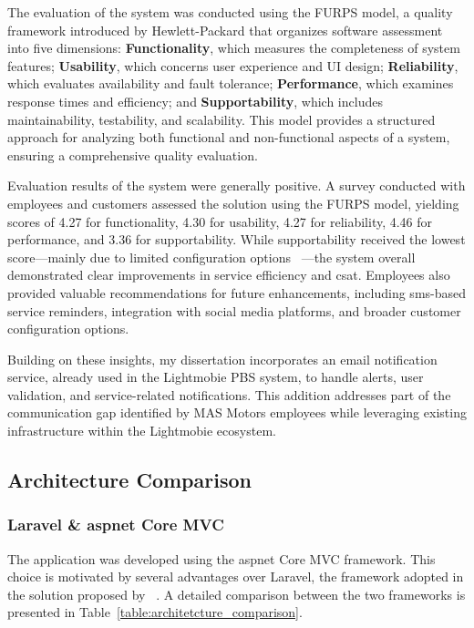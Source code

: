The evaluation of the system was conducted using the \ac{FURPS} model, a quality framework introduced by Hewlett-Packard that organizes software assessment into five dimensions: \textbf{Functionality}, which measures the completeness of system features; \textbf{Usability}, which concerns user experience and \ac{UI} design; \textbf{Reliability}, which evaluates availability and fault tolerance; \textbf{Performance}, which examines response times and efficiency; and \textbf{Supportability}, which includes maintainability, testability, and scalability. This model provides a structured approach for analyzing both functional and non-functional aspects of a system, ensuring a comprehensive quality evaluation. ~\cite{furps,  furps2}

Evaluation results of the system were generally positive. A survey conducted with employees and customers assessed the solution using the \ac{FURPS} model, yielding scores of 4.27 for functionality, 4.30 for usability, 4.27 for reliability, 4.46 for performance, and 3.36 for supportability. While supportability received the lowest score—mainly due to limited configuration options ~\cite{MAS_MOTORS}—the system overall demonstrated clear improvements in service efficiency and \acs{csat}. Employees also provided valuable recommendations for future enhancements, including \ac{sms}-based service reminders, integration with social media platforms, and broader customer configuration options.

Building on these insights, my dissertation incorporates an email notification service, already used in the Lightmobie \acs{PBS} system, to handle alerts, user validation, and service-related notifications. This addition addresses part of the communication gap identified by MAS Motors employees while leveraging existing infrastructure within the Lightmobie ecosystem.

\subsection{Architecture Comparison}
  
\subsubsection{Laravel \& \ac{aspnet} Core \ac{MVC}}

The application was developed using the \ac{aspnet} Core \ac{MVC} framework. This choice is motivated by several advantages over Laravel, the framework adopted in the solution proposed by ~\citet{MAS_MOTORS}. A detailed comparison between the two frameworks is presented in Table~\ref{table:architetcture_comparison}.

